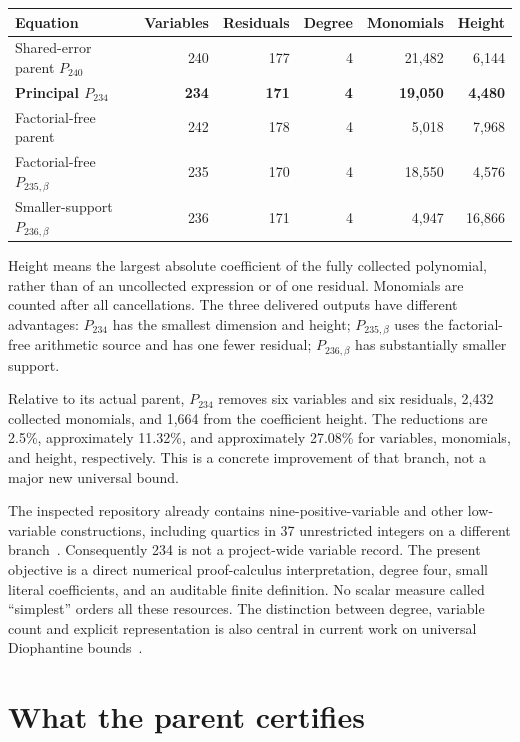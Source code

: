 \documentclass[10pt,letterpaper]{article}
\theoremstyle{definition}\newtheorem{remark}[theorem]{Remark}
\newcommand{\Par}{P_{\mathrm{240}}}
\newcommand{\New}{P_{\mathrm{234}}}
\newcommand{\BP}{P_{\mathrm{235},\beta}}
\newcommand{\SP}{P_{\mathrm{236},\beta}}
\begin{document}
\begin{center}\small
\begin{tabular}{lrrrrr}
\toprule
Equation & Variables & Residuals & Degree & Monomials & Height\\
\midrule
Shared-error parent $\Par$ &240&177&4&21,482&6,144\\
\textbf{Principal $\New$} &\textbf{234}&\textbf{171}&\textbf{4}&\textbf{19,050}&\textbf{4,480}\\
Factorial-free parent &242&178&4&5,018&7,968\\
Factorial-free $\BP$ &235&170&4&18,550&4,576\\
Smaller-support $\SP$ &236&171&4&4,947&16,866\\
\bottomrule
\end{tabular}
\end{center}

Height means the largest absolute coefficient of the fully collected
polynomial, rather than of an uncollected expression or of one residual.
Monomials are counted after all cancellations. The three delivered outputs
have different advantages: $\New$ has the smallest dimension and height;
$\BP$ uses the factorial-free arithmetic source and has one fewer residual;
$\SP$ has substantially smaller support.

Relative to its actual parent, $\New$ removes six variables and six
residuals, 2,432 collected monomials, and 1,664 from the coefficient height.
The reductions are 2.5\%, approximately 11.32\%, and approximately 27.08\%
for variables, monomials, and height, respectively. This is a concrete
improvement of that branch, not a major new universal bound.

The inspected repository already contains nine-positive-variable and
other low-variable constructions, including quartics in 37 unrestricted
integers on a different branch~\cite{overview}. Consequently 234 is not a
project-wide variable record. The present objective is a direct numerical
proof-calculus interpretation, degree four, small literal coefficients,
and an auditable finite definition. No scalar measure called
``simplest'' orders all these resources. The distinction between degree,
variable count and explicit representation is also central in current
work on universal Diophantine bounds~\cite{bayer,afp}.

\section{What the parent certifies}\label{sec:logical}
\end{document}
